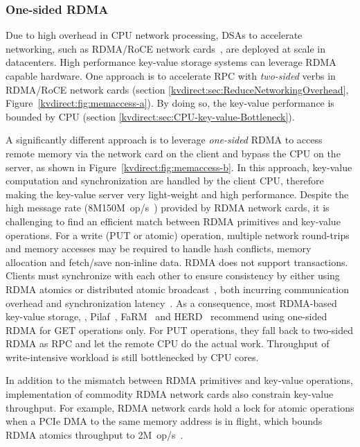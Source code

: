 \subsubsection{One-sided RDMA}

Due to high overhead in CPU network processing, DSAs to accelerate networking, such as RDMA/RoCE network cards~\cite{mellanoxrdma}, are deployed at scale in datacenters. High performance key-value storage systems can leverage RDMA capable hardware. One approach is to accelerate RPC with \textit{two-sided} verbs in RDMA/RoCE network cards (section \ref{kvdirect:sec:ReduceNetworkingOverhead}, Figure~\ref{kvdirect:fig:memaccess-a}).
By doing so, the key-value performance is bounded by CPU (section \ref{kvdirect:sec:CPU-key-value-Bottleneck}).

A significantly different approach is to leverage \textit{one-sided} RDMA to access remote memory via the network card on the client and bypass the CPU on the server, as shown in Figure~\ref{kvdirect:fig:memaccess-b}.
In this approach, key-value computation and synchronization are handled by the client CPU, therefore making the key-value server very light-weight and high performance.
Despite the high message rate (8M\approx150M~op/s~\cite{kalia2016design}) provided by RDMA network cards, it is challenging to find an efficient match between RDMA primitives and key-value operations.
For a write (PUT or atomic) operation, multiple network round-trips and memory accesses may be required to handle hash conflicts, memory allocation and fetch/save non-inline data.
RDMA does not support transactions. Clients must synchronize with each other to ensure consistency by either using RDMA atomics or distributed atomic broadcast~\cite{szepesi2014designing}, both incurring communication overhead and synchronization latency~\cite{mitchell2013using, dragojevic2014farm}.
As a consequence, most RDMA-based key-value storage, \eg, Pilaf~\cite{mitchell2013using}, FaRM~\cite{dragojevic2014farm} and HERD~\cite{kalia2014using} recommend using one-sided RDMA for GET operations only. For PUT operations, they fall back to two-sided RDMA as RPC and let the remote CPU do the actual work. Throughput of write-intensive workload is still bottlenecked by CPU cores.

In addition to the mismatch between RDMA primitives and key-value operations, implementation of commodity RDMA network cards also constrain key-value throughput. For example, RDMA network cards hold a lock for atomic operations when a PCIe DMA to the same memory address is in flight, which bounds RDMA atomics throughput to \approx2M~op/s~\cite{kalia2016design}.

